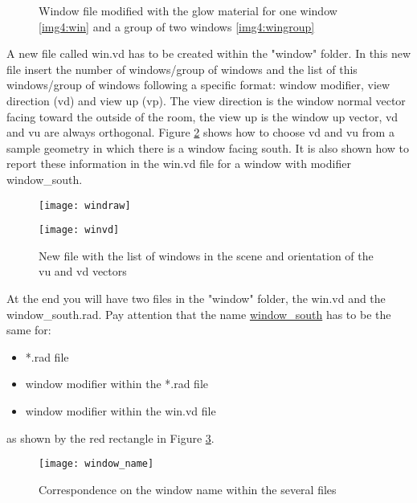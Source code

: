 \begin{figure}[h] 
\centering
  \caption{\label{img4:winglow} Window file modified with the glow material for one window \ref{img4:win} and a group of two windows \ref{img4:wingroup}}
\end{figure}

A new file called {\color{blue} win.vd} has to be created within the "window" folder. In this new file insert the number of windows/group of windows and the  list of this windows/group of windows following a specific format: window modifier, view direction (vd) and view up (vp). The view direction is the window normal vector facing toward the outside of the room, the view up is the window up vector, vd and vu are always orthogonal. Figure \ref{img4:windoworient} shows how to choose vd and vu from a sample geometry in which there is a window facing south. It is also shown how to report these information in the win.vd file for a window with modifier window\_south.

\begin{figure}[H]
\centering
\begin{minipage}[c]{0.6\linewidth}
\texttt{[image: windraw]}
\end{minipage}
\quad
\begin{minipage}[c]{0.3\linewidth}
\texttt{[image: winvd]}
\end{minipage}
\caption{\label{img4:windoworient} New file with the list of windows in the scene and orientation of the vu and vd vectors}
\end{figure}

At the end you will have two files in the "window" folder, the win.vd and the window\_south.rad. Pay attention that the name \underline{window\_south} has to be the same for:
\begin{itemize}
\item *.rad file
\item window modifier within the *.rad file
\item window modifier within the win.vd file
\end{itemize}
as shown by the red rectangle in Figure \ref{img4:window_name}.

\begin{figure}[h]
\centering
\texttt{[image: window\_name]}
\caption{\label{img4:window_name} Correspondence on the window name within the several files}
\end{figure}

